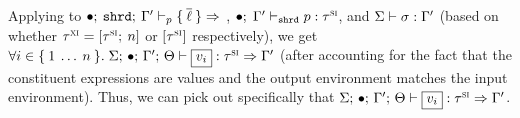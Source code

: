 \begin{preservation}
{    Applying  to
    $\oxmusafety{\oxemptyctx}{\oxvarctx^\prime}{\oximm}{\oxplaceexpr}{
      \oxset{\overline{\oxloan}}
    }$, $ \bullet; \; \Gamma^\prime \vdash_{\mathtt{shrd}} p : \tau^\textsc{si} $, and $\Sigma \vdash \sigma : \Gamma^\prime$
     (based on whether $\tau^\textsc{xi} = [\tau^\textsc{si} ; \: n]$ or
    $[\tau^\textsc{si}]$ respectively), we get
    $\forall i \in \oxset{1 \oxdots n}. \;
    \oxtypjudge{\oxglobalctx}{\oxemptyctx}{\oxkontctx}{\oxvarctx^\prime}{
      \oxvalue_i
    }{\oxsitype}{\oxvarctx^\prime}$ (after accounting for the fact that the
    constituent expressions are values and the output environment matches the
    input environment). Thus, we can pick out specifically that
    $\oxtypjudge{\oxglobalctx}{\oxemptyctx}{\oxkontctx}{\oxvarctx^\prime}{
      \oxvalue_i
    }{\oxsitype}{\oxvarctx^\prime}$.
  }


\end{preservation}


